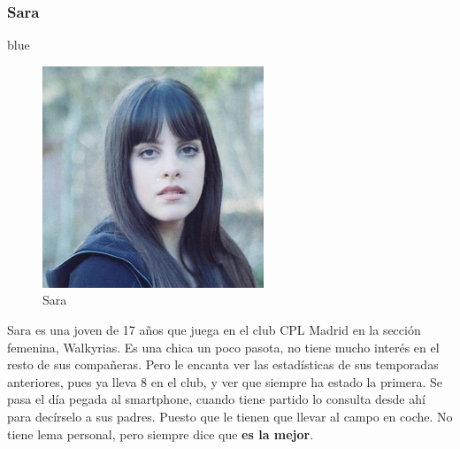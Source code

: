 \documentclass[10pt, spanish, pdftex]{template/UC3M_document}
\begin{document}
\subsubsection{Sara}
\begin{boxSara}{}{blue}
 \begin{figure}
 \includegraphics[scale=1.5]{Images/Sara.jpg}
 \caption{Sara}
 \end{figure}
 \small Sara es una joven de 17 años que juega en el club CPL Madrid en la sección femenina, Walkyrias. Es una chica un poco pasota, no tiene mucho interés en el resto de sus compañeras. Pero le encanta ver las estadísticas de sus temporadas anteriores, pues ya lleva 8 en el club, y ver que siempre ha estado la primera. Se pasa el día pegada al smartphone, cuando tiene partido lo consulta desde ahí para decírselo a sus padres. Puesto que le tienen que llevar al campo en coche.
 No tiene lema personal, pero siempre dice que \textbf{es la mejor}.
\end{boxSara}
\end{document}
